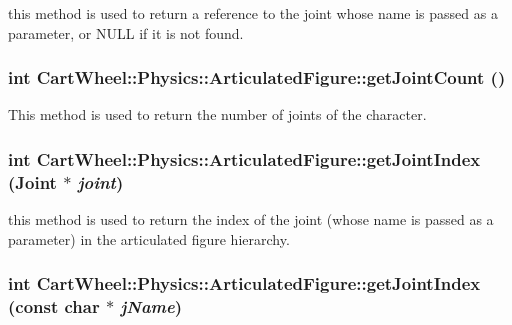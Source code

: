 \label{classCartWheel_1_1Physics_1_1ArticulatedFigure_acea82656e252a6fd1368eae140f123f3}
this method is used to return a reference to the joint whose name is passed as a parameter, or NULL if it is not found. \hypertarget{classCartWheel_1_1Physics_1_1ArticulatedFigure_a8e459d7799f5db763db1f28b6d0b8747}{
\subsubsection[{getJointCount}]{\setlength{\rightskip}{0pt plus 5cm}int CartWheel::Physics::ArticulatedFigure::getJointCount ()}}
\label{classCartWheel_1_1Physics_1_1ArticulatedFigure_a8e459d7799f5db763db1f28b6d0b8747}
This method is used to return the number of joints of the character. \hypertarget{classCartWheel_1_1Physics_1_1ArticulatedFigure_afb1246e7a496fa524ed2132b7fc8ccb0}{
\subsubsection[{getJointIndex}]{\setlength{\rightskip}{0pt plus 5cm}int CartWheel::Physics::ArticulatedFigure::getJointIndex ({\bf Joint} $\ast$ {\em joint})}}
\label{classCartWheel_1_1Physics_1_1ArticulatedFigure_afb1246e7a496fa524ed2132b7fc8ccb0}
this method is used to return the index of the joint (whose name is passed as a parameter) in the articulated figure hierarchy. \hypertarget{classCartWheel_1_1Physics_1_1ArticulatedFigure_a4096aa039849960ae74a0ff601947950}{
\subsubsection[{getJointIndex}]{\setlength{\rightskip}{0pt plus 5cm}int CartWheel::Physics::ArticulatedFigure::getJointIndex (const char $\ast$ {\em jName})}}
